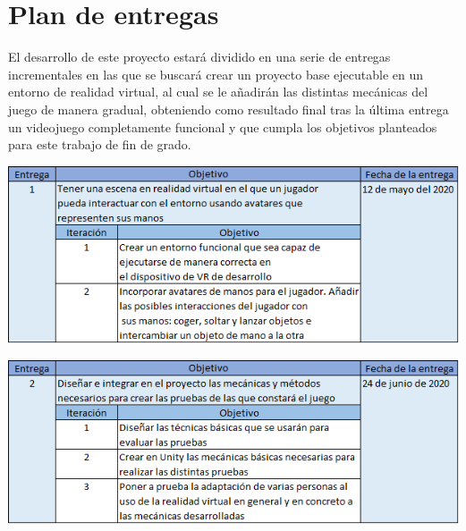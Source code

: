 



\section{Plan de entregas}


El desarrollo de este proyecto estará dividido en una serie de entregas incrementales en las que se buscará crear un proyecto base ejecutable en un entorno de realidad virtual, al cual se le añadirán las distintas mecánicas del juego de manera gradual, obteniendo como resultado final tras la última entrega un videojuego completamente funcional y que cumpla los objetivos planteados para este trabajo de fin de grado.

\begin{center}
\includegraphics[width=1\textwidth]{03.EstudioProblema/05.PlanEntregas/00.Figuras/01.entrega_1.png}
\end{center}

\begin{center}
\includegraphics[width=1\textwidth]{03.EstudioProblema/05.PlanEntregas/00.Figuras/02.entrega_2.png}
\end{center}


